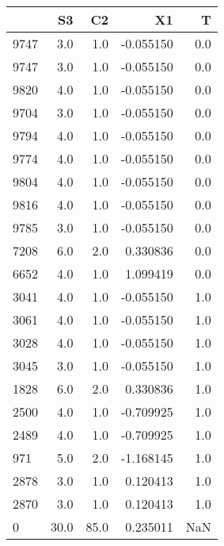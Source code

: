 \begin{tabular}{lrrrr}
\toprule
{} &    S3 &    C2 &        X1 &    T \\
\midrule
9747 &   3.0 &   1.0 & -0.055150 &  0.0 \\
9747 &   3.0 &   1.0 & -0.055150 &  0.0 \\
9820 &   4.0 &   1.0 & -0.055150 &  0.0 \\
9704 &   3.0 &   1.0 & -0.055150 &  0.0 \\
9794 &   4.0 &   1.0 & -0.055150 &  0.0 \\
9774 &   4.0 &   1.0 & -0.055150 &  0.0 \\
9804 &   4.0 &   1.0 & -0.055150 &  0.0 \\
9816 &   4.0 &   1.0 & -0.055150 &  0.0 \\
9785 &   3.0 &   1.0 & -0.055150 &  0.0 \\
7208 &   6.0 &   2.0 &  0.330836 &  0.0 \\
6652 &   4.0 &   1.0 &  1.099419 &  0.0 \\
3041 &   4.0 &   1.0 & -0.055150 &  1.0 \\
3061 &   4.0 &   1.0 & -0.055150 &  1.0 \\
3028 &   4.0 &   1.0 & -0.055150 &  1.0 \\
3045 &   3.0 &   1.0 & -0.055150 &  1.0 \\
1828 &   6.0 &   2.0 &  0.330836 &  1.0 \\
2500 &   4.0 &   1.0 & -0.709925 &  1.0 \\
2489 &   4.0 &   1.0 & -0.709925 &  1.0 \\
971  &   5.0 &   2.0 & -1.168145 &  1.0 \\
2878 &   3.0 &   1.0 &  0.120413 &  1.0 \\
2870 &   3.0 &   1.0 &  0.120413 &  1.0 \\
0    &  30.0 &  85.0 &  0.235011 &  NaN \\
\bottomrule
\end{tabular}
